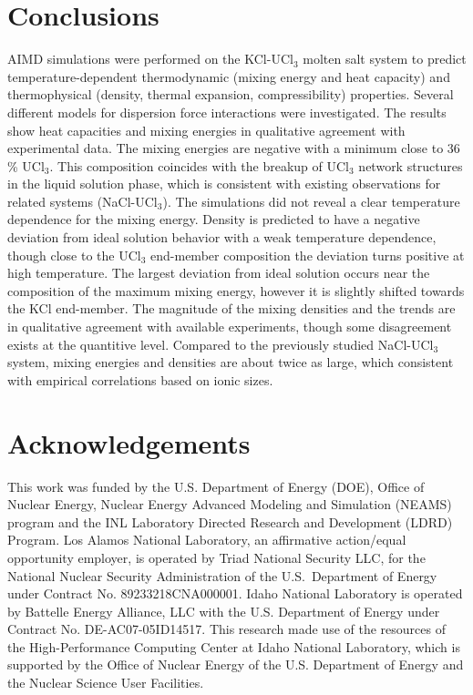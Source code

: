 \documentclass[preprint,3p,10pt,twocolumn,number,sort&compress]{elsarticle}
\begin{document}
\section{Conclusions}
\label{sec:conclusions}
AIMD simulations were performed on the KCl-UCl$_3$ molten salt system to predict temperature-dependent thermodynamic (mixing energy and heat capacity) and thermophysical (density, thermal expansion, compressibility) properties. Several different models for dispersion force interactions were investigated. The results show heat capacities and mixing energies in qualitative agreement with experimental data. The mixing energies are negative with a minimum close to 36 \% UCl$_3$. This composition coincides with the breakup of UCl$_3$ network structures  in the liquid solution phase, which is consistent with existing observations for related systems (NaCl-UCl$_3$). The simulations did not reveal a clear temperature dependence for the mixing energy. 
Density is predicted to have a negative deviation from ideal solution behavior with a weak temperature dependence, though close to the UCl$_3$ end-member composition the deviation turns positive at high temperature. The largest deviation from ideal solution occurs near the composition of the maximum mixing energy, however it is slightly shifted towards the KCl end-member. The magnitude of the mixing densities and the trends are in qualitative agreement with available experiments, though some disagreement exists at the quantitive level. Compared to the previously studied NaCl-UCl$_3$ system, mixing energies and densities are about twice as large, which consistent with empirical correlations based on ionic sizes. 


\section*{Acknowledgements}
This work was funded by the U.S. Department of Energy (DOE), Office of Nuclear Energy, Nuclear Energy Advanced Modeling and Simulation (NEAMS) program and the INL Laboratory Directed Research and Development (LDRD) Program. Los Alamos National Laboratory, an affirmative action/equal opportunity employer, is operated by Triad National Security LLC, for the National Nuclear Security Administration of the U.S.\ Department of Energy under Contract No. 89233218CNA000001. Idaho National Laboratory is operated by Battelle Energy Alliance, LLC with the U.S. Department of Energy under Contract No. DE-AC07-05ID14517. This research made use of the resources of the High-Performance Computing Center at Idaho National Laboratory, which is supported by the Office of Nuclear Energy of the U.S. Department of Energy and the Nuclear Science User Facilities.       


 

\end{document}
